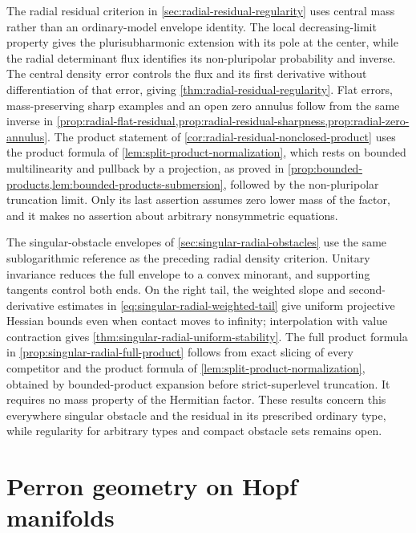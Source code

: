 \label{hist:radial-residual-regularity}
The radial residual criterion in \cref{sec:radial-residual-regularity} uses central mass rather than an ordinary-model envelope identity. The local decreasing-limit property gives the plurisubharmonic extension with its pole at the center, while the radial determinant flux identifies its non-pluripolar probability and inverse. The central density error controls the flux and its first derivative without differentiation of that error, giving \cref{thm:radial-residual-regularity}. Flat errors, mass-preserving sharp examples and an open zero annulus follow from the same inverse in \cref{prop:radial-flat-residual,prop:radial-residual-sharpness,prop:radial-zero-annulus}. The product statement of \cref{cor:radial-residual-nonclosed-product} uses the product formula of \cref{lem:split-product-normalization}, which rests on bounded multilinearity and pullback by a projection, as proved in \cref{prop:bounded-products,lem:bounded-products-submersion}, followed by the non-pluripolar truncation limit. Only its last assertion assumes zero lower mass of the factor, and it makes no assertion about arbitrary nonsymmetric equations.

\label{hist:singular-radial-obstacles}
The singular-obstacle envelopes of \cref{sec:singular-radial-obstacles} use the same sublogarithmic reference as the preceding radial density criterion. Unitary invariance reduces the full envelope to a convex minorant, and supporting tangents control both ends. On the right tail, the weighted slope and second-derivative estimates in \eqref{eq:singular-radial-weighted-tail} give uniform projective Hessian bounds even when contact moves to infinity; interpolation with value contraction gives \cref{thm:singular-radial-uniform-stability}. The full product formula in \cref{prop:singular-radial-full-product} follows from exact slicing of every competitor and the product formula of \cref{lem:split-product-normalization}, obtained by bounded-product expansion before strict-superlevel truncation. It requires no mass property of the Hermitian factor. These results concern this everywhere singular obstacle and the residual in its prescribed ordinary type, while regularity for arbitrary types and compact obstacle sets remains open.

\section{Perron geometry on Hopf manifolds}
\label{history:hopf-basic-perron}

